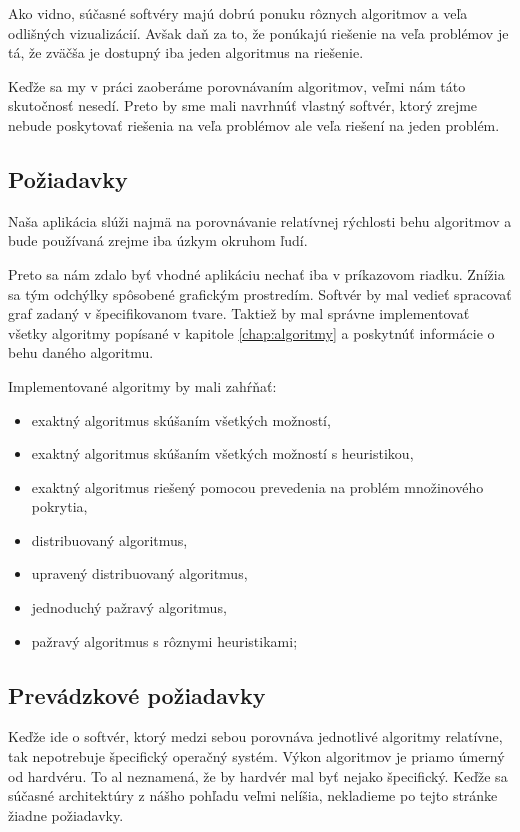 Ako vidno, súčasné softvéry majú dobrú ponuku rôznych algoritmov a veľa 
odlišných vizualizácií. Avšak daň za to, že ponúkajú riešenie na veľa problémov 
je tá, že zväčša je dostupný iba jeden algoritmus na riešenie.

Keďže sa my v práci zaoberáme porovnávaním algoritmov, veľmi nám táto 
skutočnosť nesedí. Preto by sme mali navrhnúť vlastný softvér, ktorý zrejme 
nebude poskytovať riešenia na veľa problémov ale veľa riešení na jeden problém.


\subsection{Požiadavky}

Naša aplikácia slúži najmä na porovnávanie relatívnej rýchlosti behu algoritmov 
a bude používaná zrejme iba úzkym okruhom ľudí.

Preto sa nám zdalo byť vhodné aplikáciu nechať iba v príkazovom riadku. Znížia 
sa tým odchýlky spôsobené grafickým prostredím. Softvér by mal vedieť spracovať 
graf zadaný v špecifikovanom tvare. Taktiež by mal správne 
implementovať všetky algoritmy popísané v kapitole \ref{chap:algoritmy} a 
poskytnúť informácie o behu daného algoritmu.

Implementované algoritmy by mali zahŕňať:

\begin{itemize}
	\item exaktný algoritmus skúšaním všetkých možností,
	\item exaktný algoritmus skúšaním všetkých možností s heuristikou,
	\item exaktný algoritmus riešený pomocou prevedenia na problém množinového 
		pokrytia,
	\item distribuovaný algoritmus,
	\item upravený distribuovaný algoritmus,
	\item jednoduchý pažravý algoritmus,
	\item pažravý algoritmus s rôznymi heuristikami;
\end{itemize}

\subsection{Prevádzkové požiadavky}

Keďže ide o softvér, ktorý medzi sebou porovnáva jednotlivé algoritmy 
relatívne, tak nepotrebuje špecifický operačný systém. Výkon algoritmov je 
priamo úmerný od hardvéru. To al neznamená, že by hardvér mal byť nejako 
špecifický. Keďže sa súčasné architektúry z nášho pohľadu veľmi nelíšia, 
nekladieme po tejto stránke žiadne požiadavky.

